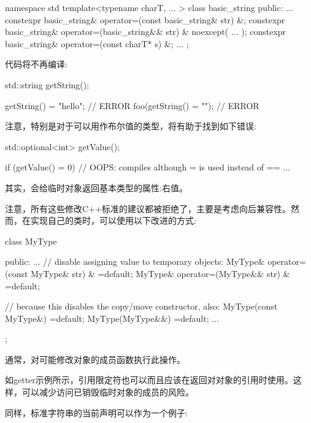 \begin{codebox}[cpp]
namespace std {
  template<typename charT, ... >
  class basic_string {
  public:
    ...
    constexpr basic_string& operator=(const basic_string& str) &;
    constexpr basic_string& operator=(basic_string&& str) & noexcept( ... );
    constexpr basic_string& operator=(const charT* s) &;
    ...
  };
}
\end{codebox}

代码将不再编译:\par

\begin{codebox}[cpp]
std::string getString();

getString() = "hello"; // ERROR
foo(getString() = ""); // ERROR
\end{codebox}

注意，特别是对于可以用作布尔值的类型，将有助于找到如下错误:\par

\begin{codebox}[cpp]
std::optional<int> getValue();

if (getValue() = 0) { // OOPS: compiles although = is used instead of ==
  ...
}
\end{codebox}

其实，会给临时对象返回基本类型的属性:右值。\par

注意，所有这些修改C++标准的建议都被拒绝了，主要是考虑向后兼容性。然而，在实现自己的类时，可以使用以下改进的方式:\par

\begin{codebox}[cpp]
class MyType {
public:
  ...
  // disable assigning value to temporary objects:
  MyType& operator=(const MyType& str) & =default;
  MyType& operator=(MyType&& str) & =default;

  // because this disables the copy/move constructor, also:
  MyType(const MyType&) =default;
  MyType(MyType&&) =default;
  ...
};
\end{codebox}

通常，对可能修改对象的成员函数执行此操作。\par


如getter示例所示，引用限定符也可以而且应该在返回对对象的引用时使用。这样，可以减少访问已销毁临时对象的成员的风险。\par

同样，标准字符串的当前声明可以作为一个例子:\par

